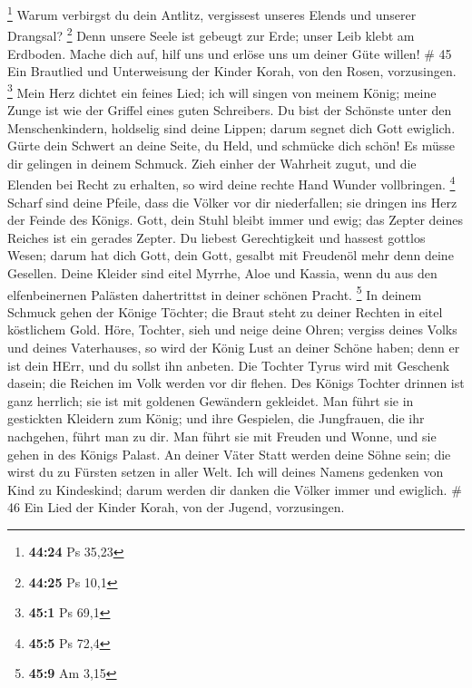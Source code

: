 \footnote{\textbf{44:24} Ps 35,23}  Warum verbirgst du dein
Antlitz, vergissest unseres Elends und unserer Drangsal? \footnote{\textbf{44:25}
  Ps 10,1}  Denn unsere Seele ist gebeugt zur Erde; unser
Leib klebt am Erdboden.  Mache dich auf, hilf uns und
erlöse uns um deiner Güte willen! \# 45  Ein Brautlied und
Unterweisung der Kinder Korah, von den Rosen, vorzusingen. \footnote{\textbf{45:1}
  Ps 69,1}  Mein Herz dichtet ein feines Lied; ich will
singen von meinem König; meine Zunge ist wie der Griffel eines guten
Schreibers.  Du bist der Schönste unter den Menschenkindern,
holdselig sind deine Lippen; darum segnet dich Gott ewiglich.
 Gürte dein Schwert an deine Seite, du Held, und schmücke
dich schön!  Es müsse dir gelingen in deinem Schmuck. Zieh
einher der Wahrheit zugut, und die Elenden bei Recht zu erhalten, so
wird deine rechte Hand Wunder vollbringen. \footnote{\textbf{45:5} Ps
  72,4}  Scharf sind deine Pfeile, dass die Völker vor dir
niederfallen; sie dringen ins Herz der Feinde des Königs. 
Gott, dein Stuhl bleibt immer und ewig; das Zepter deines Reiches ist
ein gerades Zepter.  Du liebest Gerechtigkeit und hassest
gottlos Wesen; darum hat dich Gott, dein Gott, gesalbt mit Freudenöl
mehr denn deine Gesellen.  Deine Kleider sind eitel Myrrhe,
Aloe und Kassia, wenn du aus den elfenbeinernen Palästen dahertrittst in
deiner schönen Pracht. \footnote{\textbf{45:9} Am 3,15}  In
deinem Schmuck gehen der Könige Töchter; die Braut steht zu deiner
Rechten in eitel köstlichem Gold.  Höre, Tochter, sieh und
neige deine Ohren; vergiss deines Volks und deines Vaterhauses,
 so wird der König Lust an deiner Schöne haben; denn er ist
dein HErr, und du sollst ihn anbeten.  Die Tochter Tyrus
wird mit Geschenk dasein; die Reichen im Volk werden vor dir flehen.
 Des Königs Tochter drinnen ist ganz herrlich; sie ist mit
goldenen Gewändern gekleidet.  Man führt sie in gestickten
Kleidern zum König; und ihre Gespielen, die Jungfrauen, die ihr
nachgehen, führt man zu dir.  Man führt sie mit Freuden und
Wonne, und sie gehen in des Königs Palast.  An deiner Väter
Statt werden deine Söhne sein; die wirst du zu Fürsten setzen in aller
Welt.  Ich will deines Namens gedenken von Kind zu
Kindeskind; darum werden dir danken die Völker immer und ewiglich. \# 46
 Ein Lied der Kinder Korah, von der Jugend, vorzusingen.
